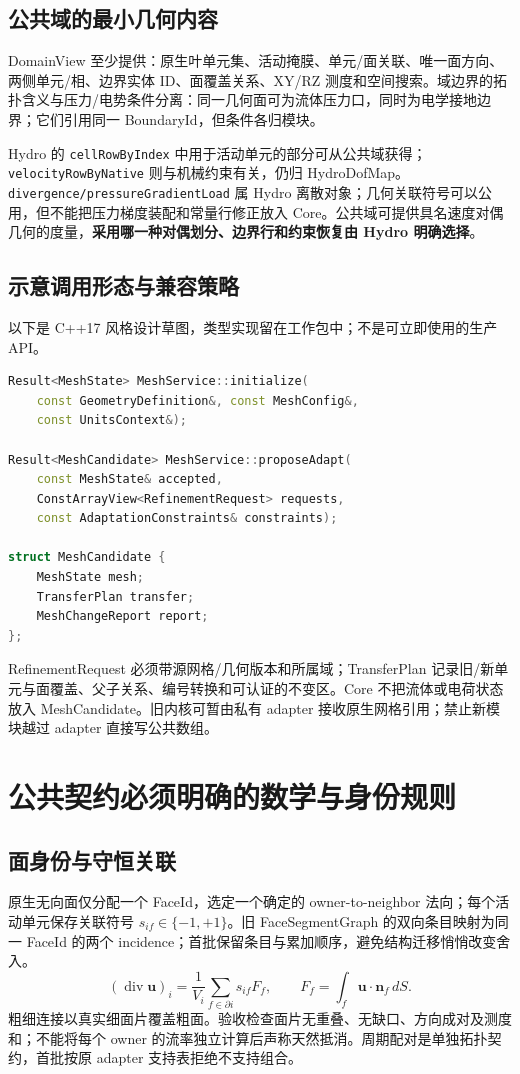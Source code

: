 \documentclass[UTF8,a4paper,11pt,fontset=fandol]{ctexart}
\newcommand{\code}[1]{\nolinkurl{#1}}
\begin{document}
\subsection{公共域的最小几何内容}
DomainView 至少提供：原生叶单元集、活动掩膜、单元/面关联、唯一面方向、两侧单元/相、边界实体 ID、面覆盖关系、XY/RZ 测度和空间搜索。域边界的拓扑含义与压力/电势条件分离：同一几何面可为流体压力口，同时为电学接地边界；它们引用同一 BoundaryId，但条件各归模块。

Hydro 的 \code{cellRowByIndex} 中用于活动单元的部分可从公共域获得；\code{velocityRowByNative} 则与机械约束有关，仍归 HydroDofMap。\code{divergence/pressureGradientLoad} 属 Hydro 离散对象；几何关联符号可以公用，但不能把压力梯度装配和常量行修正放入 Core。公共域可提供具名速度对偶几何的度量，\textbf{采用哪一种对偶划分、边界行和约束恢复由 Hydro 明确选择}。

\subsection{示意调用形态与兼容策略}
以下是 C++17 风格设计草图，类型实现留在工作包中；不是可立即使用的生产 API。
\begin{lstlisting}[language=C++]
Result<MeshState> MeshService::initialize(
    const GeometryDefinition&, const MeshConfig&,
    const UnitsContext&);

Result<MeshCandidate> MeshService::proposeAdapt(
    const MeshState& accepted,
    ConstArrayView<RefinementRequest> requests,
    const AdaptationConstraints& constraints);

struct MeshCandidate {
    MeshState mesh;
    TransferPlan transfer;
    MeshChangeReport report;
};
\end{lstlisting}
RefinementRequest 必须带源网格/几何版本和所属域；TransferPlan 记录旧/新单元与面覆盖、父子关系、编号转换和可认证的不变区。Core 不把流体或电荷状态放入 MeshCandidate。旧内核可暂由私有 adapter 接收原生网格引用；禁止新模块越过 adapter 直接写公共数组。

\section{公共契约必须明确的数学与身份规则}
\subsection{面身份与守恒关联}
原生无向面仅分配一个 FaceId，选定一个确定的 owner-to-neighbor 法向；每个活动单元保存关联符号 $s_{if}\in\{-1,+1\}$。旧 FaceSegmentGraph 的双向条目映射为同一 FaceId 的两个 incidence；首批保留条目与累加顺序，避免结构迁移悄悄改变舍入。
\[
  (\operatorname{div}\boldsymbol u)_i
  =\frac{1}{V_i}\sum_{f\in\partial i}s_{if}F_f,
  \qquad F_f=\int_f\boldsymbol u\cdot\boldsymbol n_f\,dS.
\]
粗细连接以真实细面片覆盖粗面。验收检查面片无重叠、无缺口、方向成对及测度和；不能将每个 owner 的流率独立计算后声称天然抵消。周期配对是单独拓扑契约，首批按原 adapter 支持表拒绝不支持组合。
\end{document}
